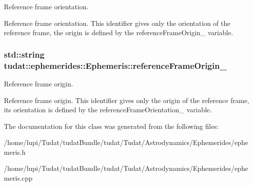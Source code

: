 Reference frame orientation. 

Reference frame orientation. This identifier gives only the orientation of the reference frame, the origin is defined by the reference\+Frame\+Origin\+\_\+ variable. 
\subsubsection[{\texorpdfstring{reference\+Frame\+Origin\+\_\+}{referenceFrameOrigin_}}]{\setlength{\rightskip}{0pt plus 5cm}std\+::string tudat\+::ephemerides\+::\+Ephemeris\+::reference\+Frame\+Origin\+\_\+\hspace{0.3cm}{\ttfamily [protected]}}\hypertarget{classtudat_1_1ephemerides_1_1Ephemeris_a69d6996ff459ef971f07b4f826528531}{}\label{classtudat_1_1ephemerides_1_1Ephemeris_a69d6996ff459ef971f07b4f826528531}


Reference frame origin. 

Reference frame origin. This identifier gives only the origin of the reference frame, its orientation is defined by the reference\+Frame\+Orientation\+\_\+ variable. 

The documentation for this class was generated from the following files\+:\begin{DoxyCompactItemize}
\item 
/home/lupi/\+Tudat/tudat\+Bundle/tudat/\+Tudat/\+Astrodynamics/\+Ephemerides/ephemeris.\+h\item 
/home/lupi/\+Tudat/tudat\+Bundle/tudat/\+Tudat/\+Astrodynamics/\+Ephemerides/ephemeris.\+cpp\end{DoxyCompactItemize}
